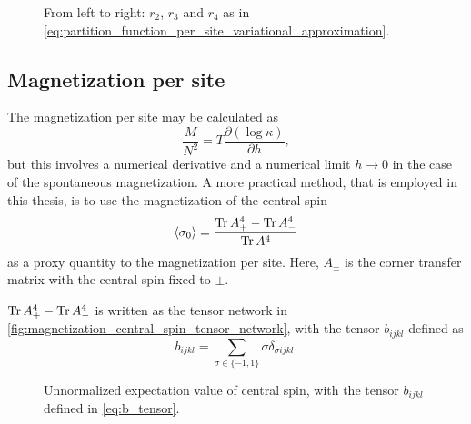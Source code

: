 \begin{figure}
  \begin{subfigure}{.33\linewidth}
    
  \end{subfigure}%
  \begin{subfigure}{.33\linewidth}
    
  \end{subfigure}
  \begin{subfigure}{.33\linewidth}
    
  \end{subfigure}
  \caption{From left to right:
  $r_2$, $r_3$ and $r_4$ as in
  \autoref{eq:partition_function_per_site_variational_approximation}.}
  \label{fig:partition_function_per_site_tensor_networks}
\end{figure}


\subsection{Magnetization per site}
The magnetization per site may be calculated as
\begin{equation}
  \frac{M}{N^2} = T \frac{\partial (\log \kappa)}{\partial h},
\end{equation}
but this involves a numerical derivative and a numerical limit $h \to 0$ in the case of the spontaneous magnetization.
A more practical method, that is employed in this thesis, is to use the magnetization of the central spin
\begin{equation}
  \langle \sigma_0 \rangle = \frac{\operatorname{Tr} A_{+}^4 - \operatorname{Tr} A_{-}^4}{\operatorname{Tr} A^4}
\end{equation}
as a proxy quantity to the magnetization per site.
Here, $A_{\pm}$ is the corner transfer matrix with the central spin fixed to $\pm$.

$\operatorname{Tr} A_{+}^4 - \operatorname{Tr} A_{-}^4$ is written as the tensor network in \autoref{fig:magnetization_central_spin_tensor_network},
with the tensor $b_{i j k l}$ defined as
\begin{equation}\label{eq:b_tensor}
  b_{i j k l} = \sum_{\sigma \in \{ -1, 1 \} } \sigma \delta_{\sigma i j k l}.
\end{equation}

\begin{figure}
  
  \caption{Unnormalized expectation value of central spin, with the tensor $b_{i j k l}$ defined in \autoref{eq:b_tensor}.}
  \label{fig:magnetization_central_spin_tensor_network}
\end{figure}


